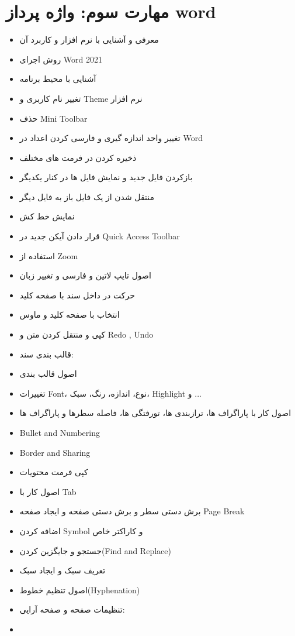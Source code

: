 \chapter{مهارت سوم: واژه پرداز word}
\begin{itemize}
\item
معرفی و آشنایی با نرم افزار و کاربرد آن
\item
روش اجرای Word 2021
\item
آشنایی با محیط برنامه
\item
تغییر نام کاربری و Theme نرم افزار
\item
حذف Mini Toolbar
\item
تغییر واحد اندازه گیری و فارسی کردن اعداد در Word
\item
ذخیره کردن در فرمت های مختلف
\item
بازکردن فایل جدید و نمایش فایل ها در کنار یکدیگر
\item
منتقل شدن از یک فایل باز به فایل دیگر
\item
نمایش خط کش
\item
قرار دادن آیکن جدید در Quick Access Toolbar
\item
استفاده از Zoom
\item
اصول تایپ لاتین و فارسی و تغییر زبان
\item
حرکت در داخل سند با صفحه کلید
\item
انتخاب با صفحه کلید و ماوس
\item
کپی و منتقل کردن متن و Redo , Undo
\item
قالب بندی سند:
\item
اصول قالب بندی
\item
تغییرات Font، نوع، اندازه، رنگ، سبک، Highlight و ...
\item
اصول کار با پاراگراف ها، ترازبندی ها، تورفتگی ها، فاصله
سطرها و پاراگراف ها
\item
Bullet and Numbering
\item
Border and Sharing
\item
کپی فرمت محتویات
\item
اصول کار با Tab
\item
برش دستی سطر و برش دستی صفحه و ایجاد صفحه Page Break
\item
اضافه کردن Symbol و کاراکتر خاص
\item
جستجو و جایگزین کردن(Find and Replace)
\item
تعریف سبک و ایجاد سبک
\item
اصول تنظیم خطوط(Hyphenation)
\item
تنظیمات صفحه و صفحه آرایی:
\item

\end{itemize}
